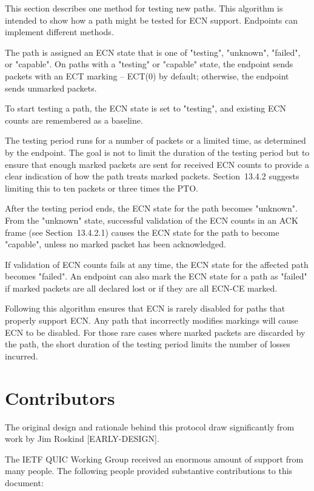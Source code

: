 \documentclass{article}
\begin{document}
This section describes one method for testing new paths.  This algorithm is intended to show how a path might be tested for ECN support.  Endpoints can implement different methods.

The path is assigned an ECN state that is one of "testing", "unknown", "failed", or "capable".  On paths with a "testing" or "capable" state, the endpoint sends packets with an ECT marking -- ECT(0) by default; otherwise, the endpoint sends unmarked packets.

To start testing a path, the ECN state is set to "testing", and existing ECN counts are remembered as a baseline.

The testing period runs for a number of packets or a limited time, as determined by the endpoint.  The goal is not to limit the duration of the testing period but to ensure that enough marked packets are sent for received ECN counts to provide a clear indication of how the path treats marked packets.  Section~13.4.2 suggests limiting this to ten packets or three times the PTO.

After the testing period ends, the ECN state for the path becomes "unknown".  From the "unknown" state, successful validation of the ECN counts in an ACK frame (see Section~13.4.2.1) causes the ECN state for the path to become "capable", unless no marked packet has been acknowledged.

If validation of ECN counts fails at any time, the ECN state for the affected path becomes "failed".  An endpoint can also mark the ECN state for a path as "failed" if marked packets are all declared lost or if they are all ECN-CE marked.

Following this algorithm ensures that ECN is rarely disabled for paths that properly support ECN.  Any path that incorrectly modifies markings will cause ECN to be disabled.  For those rare cases where marked packets are discarded by the path, the short duration of the testing period limits the number of losses incurred.

\section*{Contributors}

The original design and rationale behind this protocol draw significantly from work by Jim Roskind [EARLY-DESIGN].

The IETF QUIC Working Group received an enormous amount of support from many people.  The following people provided substantive contributions to this document:
\end{document}
